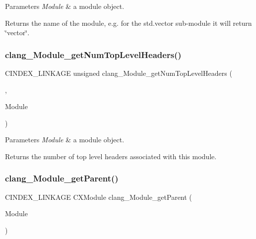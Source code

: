 \begin{DoxyParams}{Parameters}
{\em Module} & a module object.\\
\hline
\end{DoxyParams}
\begin{DoxyReturn}{Returns}
the name of the module, e.\+g. for the \textquotesingle{}std.\+vector\textquotesingle{} sub-\/module it will return \char`\"{}vector\char`\"{}. 
\end{DoxyReturn}
\mbox{\label{group__CINDEX__MODULE_gaee667293d56a18d3e8c17e37ce77cb0d}} 
\subsubsection{\texorpdfstring{clang\+\_\+\+Module\+\_\+get\+Num\+Top\+Level\+Headers()}{clang\_Module\_getNumTopLevelHeaders()}}
{\footnotesize\ttfamily C\+I\+N\+D\+E\+X\+\_\+\+L\+I\+N\+K\+A\+GE unsigned clang\+\_\+\+Module\+\_\+get\+Num\+Top\+Level\+Headers (\begin{DoxyParamCaption}\item[{\mbox{\hyperlink{group__CINDEX_gacdb7815736ca709ce9a5e1ec2b7e16ac}{C\+X\+Translation\+Unit}}}]{,  }\item[{C\+X\+Module}]{Module }\end{DoxyParamCaption})}


\begin{DoxyParams}{Parameters}
{\em Module} & a module object.\\
\hline
\end{DoxyParams}
\begin{DoxyReturn}{Returns}
the number of top level headers associated with this module. 
\end{DoxyReturn}
\mbox{\label{group__CINDEX__MODULE_ga62e149a28d71b719b11aefee3d36df53}} 
\subsubsection{\texorpdfstring{clang\+\_\+\+Module\+\_\+get\+Parent()}{clang\_Module\_getParent()}}
{\footnotesize\ttfamily C\+I\+N\+D\+E\+X\+\_\+\+L\+I\+N\+K\+A\+GE C\+X\+Module clang\+\_\+\+Module\+\_\+get\+Parent (\begin{DoxyParamCaption}\item[{C\+X\+Module}]{Module }\end{DoxyParamCaption})}


